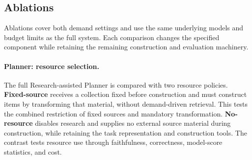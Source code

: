 \documentclass{article} %
\begin{document}
	\subsection{Ablations}
	\label{sec:ablations}
	
	Ablations cover both demand settings and use the same underlying models and
	budget limits as the full system. Each comparison changes the specified
	component while retaining the remaining construction and evaluation machinery.

	\begin{table}[htbp]
		\centering
		\setlength{\belowcaptionskip}{8pt}
		\caption{Ablation results for EvalScientist.}
		\label{tab:ablation-results}
		\small
		\renewcommand{\arraystretch}{1.4}
		\setlength{\tabcolsep}{6pt}
	\end{table}
	
	\paragraph{Planner: resource selection.}
	The full Research-assisted Planner is compared with two resource policies.
	\textbf{Fixed-source} receives a collection fixed before construction and must
	construct items by transforming that material, without demand-driven retrieval.
	This tests the combined restriction of fixed sources and mandatory
	transformation. \textbf{No-resource} disables research and supplies no external
	source material during construction, while retaining the task representation
	and construction tools. The contrast tests resource use through faithfulness,
	correctness, model-score statistics, and cost.
	
\end{document}
